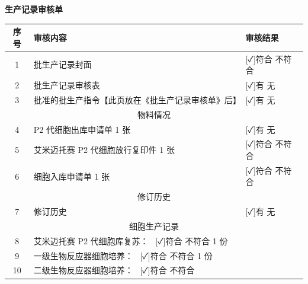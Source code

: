 \documentclass[UTF8,10pt,a4paper,fontset=fandol]{ctexart}
\newcommand{\fieldvalue}[1]{#1}
\newcommand{\handwritten}[1]{#1}
\begin{document}
\begin{center}
\textbf{生产记录审核单}
\end{center}

\small
\begin{tabularx}{\textwidth}{|c|X|l|}
\hline
序号 & 审核内容 & 审核结果 \\
\hline
1 & 批生产记录封面 &
\fieldvalue{[✓]符合 \quad [ ]不符合} \\
\hline
2 & 批生产记录审核表 &
\fieldvalue{[✓]有 \quad [ ]无} \\
\hline
3 & 批准的批生产指令【此页放在《批生产记录审核单》后】 &
\fieldvalue{[✓]有 \quad [ ]无} \\
\hline
\multicolumn{3}{|c|}{物料情况} \\
\hline
4 & P2 代细胞出库申请单 1 张 &
\fieldvalue{[✓]有 \quad [ ]无} \\
\hline
5 & 艾米迈托赛 P2 代细胞放行复印件 1 张 &
\fieldvalue{[✓]符合 \quad [ ]不符合} \\
\hline
6 & 细胞入库申请单 1 张 &
\fieldvalue{[✓]符合 \quad [ ]不符合} \\
\hline
\multicolumn{3}{|c|}{修订历史} \\
\hline
7 & 修订历史 &
\fieldvalue{[✓]有 \quad [ ]无} \\
\hline
\multicolumn{3}{|c|}{细胞生产记录} \\
\hline
8 & 艾米迈托赛 P2 代细胞库复苏：\ 
\fieldvalue{[✓]符合 \quad [ ]不符合}
\quad
\fieldvalue{\handwritten{1}} 份 &
\\
\hline
9 & 一级生物反应器细胞培养：\ 
\fieldvalue{[✓]符合 \quad [ ]不符合}
\quad
\fieldvalue{\handwritten{1}} 份 &
\\
\hline
10 & 二级生物反应器细胞培养：\ 
\fieldvalue{[✓]符合 \quad [ ]不符合}
\quad

\end{tabularx}
\end{document}

